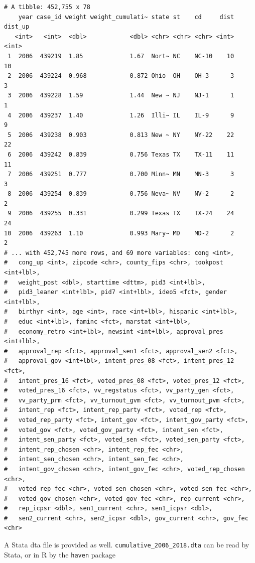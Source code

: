 \documentclass[10pt,article,oneside]{memoir}
\theoremstyle{definition}
\begin{document}
\begin{verbatim}
# A tibble: 452,755 x 78
    year case_id weight weight_cumulati~ state st    cd     dist dist_up
   <int>   <int>  <dbl>            <dbl> <chr> <chr> <chr> <int>   <int>
 1  2006  439219  1.85             1.67  Nort~ NC    NC-10    10      10
 2  2006  439224  0.968            0.872 Ohio  OH    OH-3      3       3
 3  2006  439228  1.59             1.44  New ~ NJ    NJ-1      1       1
 4  2006  439237  1.40             1.26  Illi~ IL    IL-9      9       9
 5  2006  439238  0.903            0.813 New ~ NY    NY-22    22      22
 6  2006  439242  0.839            0.756 Texas TX    TX-11    11      11
 7  2006  439251  0.777            0.700 Minn~ MN    MN-3      3       3
 8  2006  439254  0.839            0.756 Neva~ NV    NV-2      2       2
 9  2006  439255  0.331            0.299 Texas TX    TX-24    24      24
10  2006  439263  1.10             0.993 Mary~ MD    MD-2      2       2
# ... with 452,745 more rows, and 69 more variables: cong <int>,
#   cong_up <int>, zipcode <chr>, county_fips <chr>, tookpost <int+lbl>,
#   weight_post <dbl>, starttime <dttm>, pid3 <int+lbl>,
#   pid3_leaner <int+lbl>, pid7 <int+lbl>, ideo5 <fct>, gender <int+lbl>,
#   birthyr <int>, age <int>, race <int+lbl>, hispanic <int+lbl>,
#   educ <int+lbl>, faminc <fct>, marstat <int+lbl>,
#   economy_retro <int+lbl>, newsint <int+lbl>, approval_pres <int+lbl>,
#   approval_rep <fct>, approval_sen1 <fct>, approval_sen2 <fct>,
#   approval_gov <int+lbl>, intent_pres_08 <fct>, intent_pres_12 <fct>,
#   intent_pres_16 <fct>, voted_pres_08 <fct>, voted_pres_12 <fct>,
#   voted_pres_16 <fct>, vv_regstatus <fct>, vv_party_gen <fct>,
#   vv_party_prm <fct>, vv_turnout_gvm <fct>, vv_turnout_pvm <fct>,
#   intent_rep <fct>, intent_rep_party <fct>, voted_rep <fct>,
#   voted_rep_party <fct>, intent_gov <fct>, intent_gov_party <fct>,
#   voted_gov <fct>, voted_gov_party <fct>, intent_sen <fct>,
#   intent_sen_party <fct>, voted_sen <fct>, voted_sen_party <fct>,
#   intent_rep_chosen <chr>, intent_rep_fec <chr>,
#   intent_sen_chosen <chr>, intent_sen_fec <chr>,
#   intent_gov_chosen <chr>, intent_gov_fec <chr>, voted_rep_chosen <chr>,
#   voted_rep_fec <chr>, voted_sen_chosen <chr>, voted_sen_fec <chr>,
#   voted_gov_chosen <chr>, voted_gov_fec <chr>, rep_current <chr>,
#   rep_icpsr <dbl>, sen1_current <chr>, sen1_icpsr <dbl>,
#   sen2_current <chr>, sen2_icpsr <dbl>, gov_current <chr>, gov_fec <chr>
\end{verbatim}

A Stata dta file is provided as well.
\texttt{cumulative\_2006\_2018.dta} can be read by Stata, or in R by the
\texttt{haven} package
\end{document}
